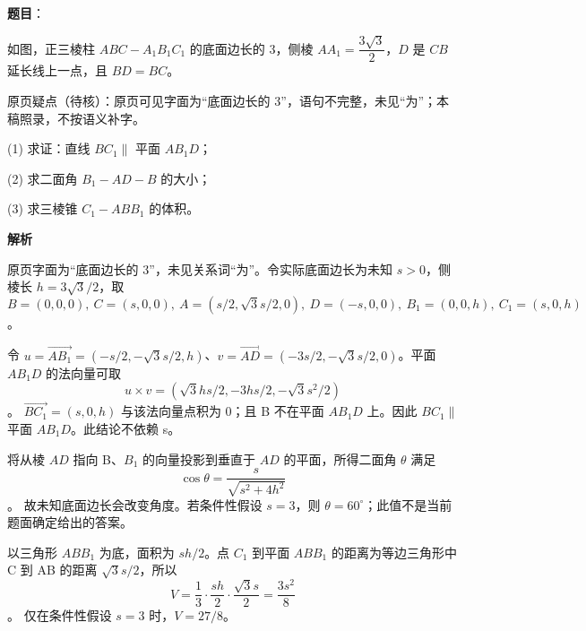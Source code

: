 \begin{answer}

\textbf{题目}：

如图，正三棱柱 \(ABC-A_1B_1C_1\) 的底面边长的 3，侧棱 \(AA_1=\dfrac{3\sqrt3}{2}\)，\(D\) 是 \(CB\) 延长线上一点，且 \(BD=BC\)。

\begin{gktip}
原页疑点（待核）：原页可见字面为“底面边长的 3”，语句不完整，未见“为”；本稿照录，不按语义补字。
\end{gktip}

    (1) 求证：直线 \(BC_1\parallel\) 平面 \(AB_1D\)；

    (2) 求二面角 \(B_1-AD-B\) 的大小；

    (3) 求三棱锥 \(C_1-ABB_1\) 的体积。
\nopagebreak[4]
\begin{center}\end{center}
\nopagebreak[4]
\textbf{解析}

原页字面为“底面边长的 3”，未见关系词“为”。令实际底面边长为未知 \(s>0\)，侧棱长 \(h=3\sqrt3/2\)，取
\nopagebreak[4]
\[
B=(0,0,0),\ C=(s,0,0),\ A=(s/2,\sqrt3s/2,0),\ D=(-s,0,0),\ B_1=(0,0,h),\ C_1=(s,0,h)
\]
。


令 \(u=\overrightarrow{AB_1}=(-s/2,-\sqrt3s/2,h)\)、\(v=\overrightarrow{AD}=(-3s/2,-\sqrt3s/2,0)\)。平面 \(AB_1D\) 的法向量可取
\nopagebreak[4]
\[
u\times v=(\sqrt3hs/2,-3hs/2,-\sqrt3s^2/2)
\]
。
\(\overrightarrow{BC_1}=(s,0,h)\) 与该法向量点积为 0；且 B 不在平面 \(AB_1D\) 上。因此 \(BC_1\parallel\) 平面 \(AB_1D\)。此结论不依赖 s。


将从棱 \(AD\) 指向 B、\(B_1\) 的向量投影到垂直于 \(AD\) 的平面，所得二面角 \(\theta\) 满足
\nopagebreak[4]
\[
\cos\theta=\frac{s}{\sqrt{s^2+4h^2}}
\]
。
故未知底面边长会改变角度。若条件性假设 \(s=3\)，则 \(\theta=60^\circ\)；此值不是当前题面确定给出的答案。


以三角形 \(ABB_1\) 为底，面积为 \(sh/2\)。点 \(C_1\) 到平面 \(ABB_1\) 的距离为等边三角形中 C 到 AB 的距离 \(\sqrt3s/2\)，所以
\nopagebreak[4]
\[
V=\frac13\cdot\frac{sh}{2}\cdot\frac{\sqrt3s}{2}=\frac{3s^2}{8}
\]
。
仅在条件性假设 \(s=3\) 时，\(V=27/8\)。




\end{answer}
